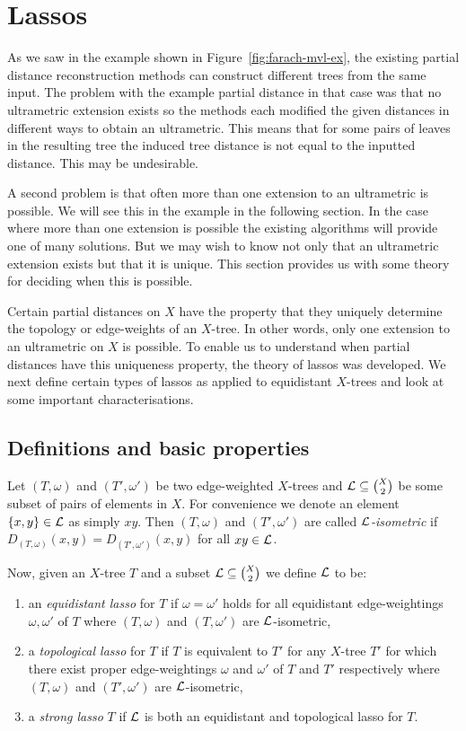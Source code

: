 \section{Lassos}
\label{sec:lassoing-corralling}

As we saw in the example shown in Figure~\ref{fig:farach-mvl-ex}, the existing
partial distance reconstruction methods can construct different trees from the
same input.  The problem with the example partial distance in that case was
that no ultrametric extension exists so the methods each modified the given
distances in different ways to obtain an ultrametric.  This means that for
some pairs of leaves in the resulting tree the induced tree distance is not
equal to the inputted distance.  This may be undesirable.

A second problem is that often more than one extension to an ultrametric is
possible.  We will see this in the example in the following section.  In the
case where more than one extension is possible the existing algorithms will
provide one of many solutions.  But we may wish to know not only that an
ultrametric extension exists but that it is unique.  This section provides us
with some theory for deciding when this is possible.

Certain partial distances on $X$ have the property that they uniquely
determine the topology or edge-weights of an $X$-tree.  In other words, only
one extension to an ultrametric on $X$ is possible.  To enable us to
understand when partial distances have this uniqueness property, the theory of
lassos was developed.  We next define certain types of lassos as applied to
equidistant $X$-trees and look at some important characterisations.

\subsection{Definitions and basic properties}
\label{sec:defin-basic-prop}

Let $(T,\omega)$ and $(T',\omega')$ be two edge-weighted $X$-trees and ${\mathcal L}
\subseteq {X \choose 2}$ be some subset of pairs of elements in $X$.  For
convenience we denote an element $\{x,y\} \in {\mathcal L}$ as simply $xy$.  Then
$(T,\omega)$ and $(T',\omega')$ are called \textit{${\mathcal L}$-isometric} if
$D_{(T,\omega)}(x,y) = D_{(T',\omega')}(x,y)$ for all $xy \in {\mathcal L}$.

Now, given an $X$-tree $T$ and a subset ${\mathcal L} \subseteq {X \choose 2}$ we
define ${\mathcal L}$ to be:
\begin{enumerate}[label=(\roman*)]
\item an \textit{equidistant lasso} for $T$ if $\omega = \omega'$ holds for
  all equidistant edge-weightings $\omega,\omega'$ of $T$ where $(T,\omega)$
  and $(T,\omega')$ are ${\mathcal L}$-isometric,
\item a \textit{topological lasso} for $T$ if $T$ is equivalent to $T'$ for
  any $X$-tree $T'$ for which there exist proper edge-weightings $\omega$ and
  $\omega'$ of $T$ and $T'$ respectively where $(T,\omega)$ and $(T',\omega')$
  are ${\mathcal L}$-isometric,
\item a \textit{strong lasso} $T$ if ${\mathcal L}$ is both an equidistant and
  topological lasso for $T$.
\end{enumerate}

